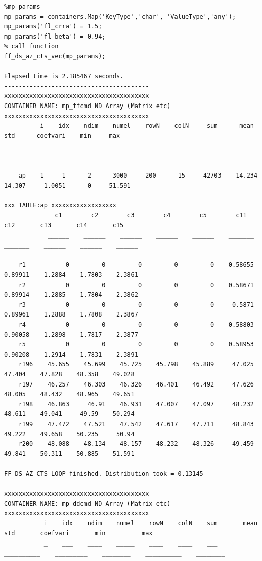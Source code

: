 \documentclass[
]{book}
\begin{document}
\begin{verbatim}
%mp_params
mp_params = containers.Map('KeyType','char', 'ValueType','any');
mp_params('fl_crra') = 1.5;
mp_params('fl_beta') = 0.94;
% call function
ff_ds_az_cts_vec(mp_params);

Elapsed time is 2.185467 seconds.
----------------------------------------
xxxxxxxxxxxxxxxxxxxxxxxxxxxxxxxxxxxxxxxx
CONTAINER NAME: mp_ffcmd ND Array (Matrix etc)
xxxxxxxxxxxxxxxxxxxxxxxxxxxxxxxxxxxxxxxx
          i    idx    ndim    numel    rowN    colN     sum      mean      std      coefvari    min     max  
          _    ___    ____    _____    ____    ____    _____    ______    ______    ________    ___    ______

    ap    1     1      2      3000     200      15     42703    14.234    14.307     1.0051      0     51.591

xxx TABLE:ap xxxxxxxxxxxxxxxxxx
              c1        c2        c3        c4        c5        c11        c12       c13       c14       c15  
            ______    ______    ______    ______    ______    _______    _______    ______    ______    ______

    r1           0         0         0         0         0    0.58655    0.89911    1.2884    1.7803    2.3861
    r2           0         0         0         0         0    0.58671    0.89914    1.2885    1.7804    2.3862
    r3           0         0         0         0         0     0.5871    0.89961    1.2888    1.7808    2.3867
    r4           0         0         0         0         0    0.58803    0.90058    1.2898    1.7817    2.3877
    r5           0         0         0         0         0    0.58953    0.90208    1.2914    1.7831    2.3891
    r196    45.655    45.699    45.725    45.798    45.889     47.025     47.404    47.828    48.358    49.028
    r197    46.257    46.303    46.326    46.401    46.492     47.626     48.005    48.432    48.965    49.651
    r198    46.863     46.91    46.931    47.007    47.097     48.232     48.611    49.041     49.59    50.294
    r199    47.472    47.521    47.542    47.617    47.711     48.843     49.222    49.658    50.235     50.94
    r200    48.088    48.134    48.157    48.232    48.326     49.459     49.841    50.311    50.885    51.591

FF_DS_AZ_CTS_LOOP finished. Distribution took = 0.13145
----------------------------------------
xxxxxxxxxxxxxxxxxxxxxxxxxxxxxxxxxxxxxxxx
CONTAINER NAME: mp_ddcmd ND Array (Matrix etc)
xxxxxxxxxxxxxxxxxxxxxxxxxxxxxxxxxxxxxxxx
           i    idx    ndim    numel    rowN    colN    sum       mean          std       coefvari       min          max   
           _    ___    ____    _____    ____    ____    ___    __________    _________    ________    __________    ________


\end{verbatim}
\end{document}

